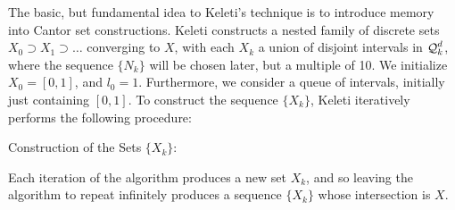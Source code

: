 
The basic, but fundamental idea to Keleti's technique is to introduce memory into Cantor set constructions. Keleti constructs a nested family of discrete sets $X_0 \supset X_1 \supset \dots$ converging to $X$, with each $X_k$ a union of disjoint intervals in $\operatorname{\mathcal{Q}}_k^d$, where the sequence $\{ N_k \}$ will be chosen later, but a multiple of 10. We initialize $X_0 = [0,1]$, and $l_0 = 1$. Furthermore, we consider a queue of intervals, initially just containing $[0,1]$. To construct the sequence $\{ X_k \}$, Keleti iteratively performs the following procedure:
%
\begin{algorithm}[H]
    \begin{algorithmic}%
        \caption{Construction of the Sets $\{ X_k \}$:}
        \MRepeat


            \EndForAll
        \EndRepeat   
    \end{algorithmic}
\end{algorithm}

Each iteration of the algorithm produces a new set $X_k$, and so leaving the algorithm to repeat infinitely produces a sequence $\{ X_k \}$ whose intersection is $X$.

